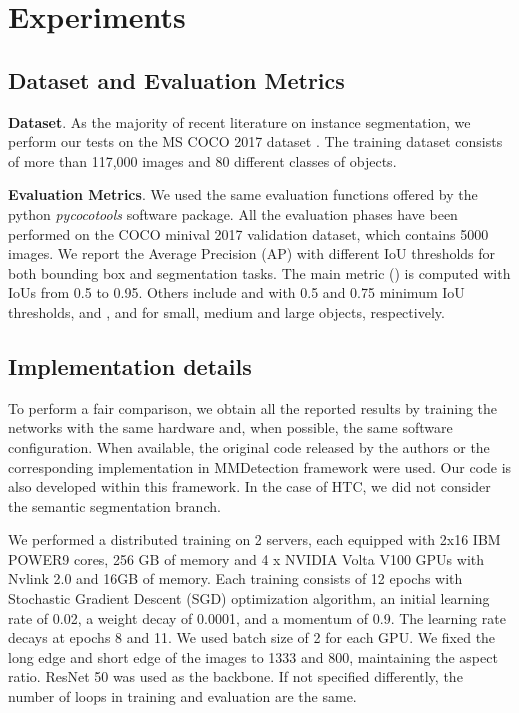 \documentclass[runningheads, orivec]{llncs}
\begin{document}
 \section{Experiments}
\label{sec:experiments}
\subsection{Dataset and Evaluation Metrics}
\label{subsec:dataset}
\noindent\textbf{Dataset}.
As the majority of recent literature on instance segmentation, we perform our tests on the MS COCO 2017 dataset \cite{lin2014microsoft}.
The training dataset consists of more than 117,000 images and 80 different classes of objects.

\noindent\textbf{Evaluation Metrics}.
We used the same evaluation functions offered by the python \textit{pycocotools} software package.
All the evaluation phases have been performed on the COCO minival 2017 validation dataset, which contains 5000 images. We report the Average Precision (AP) with different IoU thresholds for both bounding box and segmentation tasks.
The main metric () is computed with IoUs from 0.5 to 0.95.
Others include  and  with 0.5 and 0.75 minimum IoU thresholds, and ,  and  for small, medium and large objects, respectively.

\subsection{Implementation details}
To perform a fair comparison, we obtain all the reported results by training the networks with the same hardware and, when possible, the same software configuration.
When available, the original code released by the authors or the corresponding implementation in MMDetection \cite{mmdetection} framework were used.
Our code is also developed within this framework.
In the case of HTC, we did not consider the semantic segmentation branch.

We performed a distributed training on 2 servers, each equipped with 2x16 IBM POWER9 cores, 256 GB of memory and 4 x NVIDIA Volta V100 GPUs with Nvlink 2.0 and 16GB of memory.
Each training consists of 12 epochs with Stochastic Gradient Descent (SGD) optimization algorithm, an initial learning rate of 0.02, a weight decay of 0.0001, and a momentum of 0.9. 
The learning rate decays at epochs 8 and 11. 
We used batch size of 2 for each GPU.
We fixed the long edge and short edge of the images to 1333 and 800, maintaining the aspect ratio.
ResNet 50 \cite{he2016deep} was used as the backbone.
If not specified differently, the number of loops in training and evaluation are the same.
\end{document}
